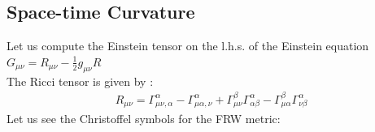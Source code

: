 \subsection{Space-time Curvature}
\hspace{0.5cm}Let us compute the Einstein tensor on the l.h.s. of the Einstein equation $G_{\mu \nu } = R_{\mu \nu } - \frac{1}{2} g_{\mu \nu } R$ \\ 
The Ricci tensor is given by :
\begin{align}
        R_{\mu \nu } = \Gamma^{\alpha }_{\mu \nu , \alpha } 
        - \Gamma^{\alpha }_{\mu \alpha , \nu }
        + \Gamma^{\beta }_{\mu \nu } \Gamma^{\alpha }_{\alpha \beta } 
        - \Gamma^{\beta}_{\mu \alpha } \Gamma^{\alpha }_{\nu \beta }
\end{align}
Let us see the Christoffel symbols for the FRW metric:\label{1.12}

